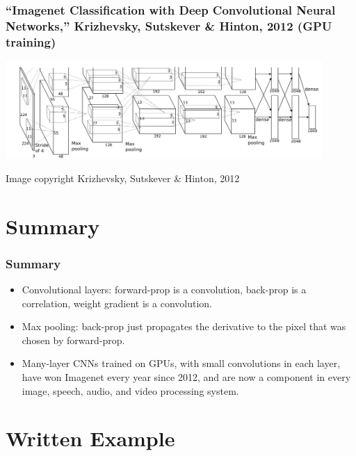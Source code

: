 \documentclass{beamer}
\begin{document}
\begin{frame}
  \frametitle{``Imagenet Classification with Deep Convolutional Neural
    Networks,'' Krizhevsky, Sutskever \& Hinton, 2012 (GPU training)}
  \centerline{\includegraphics[width=4.75in]{figs/krizhevsky2012.png}}
  \begin{tiny}Image copyright Krizhevsky, Sutskever \& Hinton, 2012\end{tiny}
\end{frame}


\section{Summary}
\setcounter{subsection}{1}

\begin{frame}
  \frametitle{Summary}
  \begin{itemize}
  \item Convolutional layers: forward-prop is a convolution, back-prop
    is a correlation, weight gradient is a convolution.
  \item Max pooling: back-prop just propagates the derivative to the
    pixel that was chosen by forward-prop.
  \item Many-layer CNNs trained on GPUs, with small convolutions in
    each layer, have won Imagenet every year since 2012, and are now a
    component in every image, speech, audio, and video processing
    system.
  \end{itemize}
\end{frame}

\section[Example]{Written Example}
\setcounter{subsection}{1}
\end{document}
